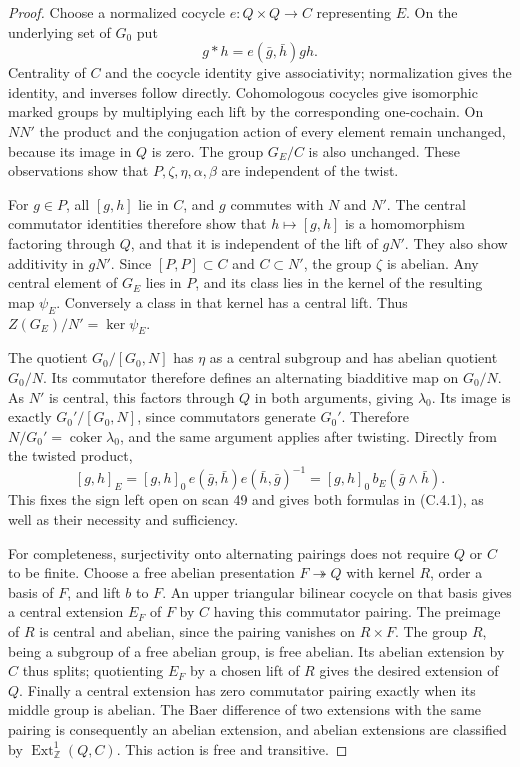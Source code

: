 \begin{proof}
Choose a normalized cocycle $e:Q\times Q\to C$ representing $E$. On the
underlying set of $G_0$ put
\[
 g*h=e(\bar g,\bar h)gh.
\]
Centrality of $C$ and the cocycle identity give associativity; normalization
gives the identity, and inverses follow directly. Cohomologous cocycles give
isomorphic marked groups by multiplying each lift by the corresponding
one-cochain. On $NN'$ the product and the conjugation action of every element
remain unchanged, because its image in $Q$ is zero. The group $G_E/C$ is
also unchanged. These observations show that $P,\zeta,\eta,\alpha,\beta$
are independent of the twist.

For $g\in P$, all $[g,h]$ lie in $C$, and $g$ commutes with $N$ and $N'$.
The central commutator identities therefore show that $h\mapsto[g,h]$
is a homomorphism factoring through $Q$, and that it is independent of the
lift of $gN'$. They also show additivity in $gN'$. Since $[P,P]\subset C$
and $C\subset N'$, the group $\zeta$ is abelian. Any central element of
$G_E$ lies in $P$, and its class lies in the kernel of the resulting map
$\psi_E$. Conversely a class in that kernel has a central lift. Thus
$Z(G_E)/N'=\ker\psi_E$.

The quotient $G_0/[G_0,N]$ has $\eta$ as a central subgroup and has abelian
quotient $G_0/N$. Its commutator therefore defines an alternating biadditive
map on $G_0/N$. As $N'$ is central, this factors through $Q$ in both
arguments, giving $\lambda_0$. Its image is exactly
$G_0'/[G_0,N]$, since commutators generate $G_0'$. Therefore
$N/G_0'=\operatorname{coker}\lambda_0$, and the same argument applies after
twisting. Directly from the twisted product,
\[
 [g,h]_E=[g,h]_0\,e(\bar g,\bar h)e(\bar h,\bar g)^{-1}
        =[g,h]_0\,b_E(\bar g\wedge\bar h).
\]
This fixes the sign left open on scan 49 and gives both formulas in
(C.4.1), as well as their necessity and sufficiency.

For completeness, surjectivity onto alternating pairings does not require
$Q$ or $C$ to be finite. Choose a free abelian presentation $F\twoheadrightarrow
Q$ with kernel $R$, order a basis of $F$, and lift $b$ to $F$. An upper
triangular bilinear cocycle on that basis gives a central extension
$E_F$ of $F$ by $C$ having this commutator pairing. The preimage of $R$
is central and abelian, since the pairing vanishes on $R\times F$.
The group $R$, being a subgroup of a free abelian group, is free abelian.
Its abelian extension by $C$ thus splits; quotienting $E_F$ by a chosen
lift of $R$ gives the desired extension of $Q$. Finally a central extension
has zero commutator pairing exactly when its middle group is abelian.
The Baer difference of two extensions with the same pairing is consequently
an abelian extension, and abelian extensions are classified by
$\operatorname{Ext}^1_{\mathbb Z}(Q,C)$. This action is free and transitive.


\end{proof}
